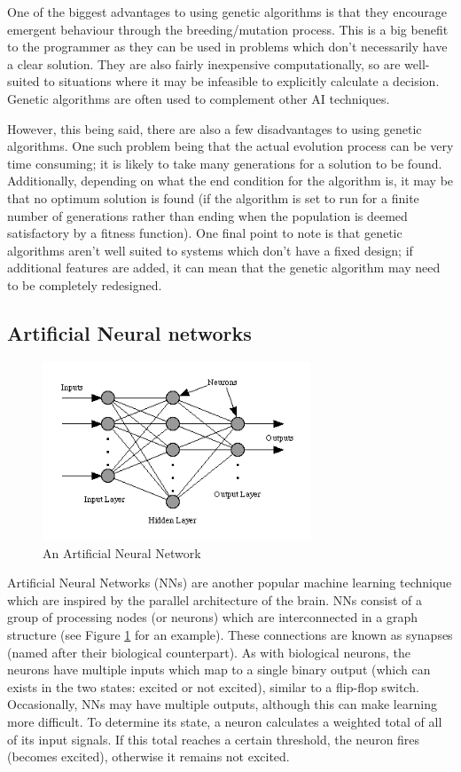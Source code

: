 \documentclass[a4paper,oneside]{report}
\begin{document}
One of the biggest advantages to using genetic algorithms is that they encourage emergent behaviour through the breeding/mutation process. This is a big benefit to the programmer as they can be used in problems which don't necessarily have a clear solution. They are also fairly inexpensive computationally, so are well-suited to situations where it may be infeasible to explicitly calculate a decision. Genetic algorithms are often used to complement other AI techniques.

However, this being said, there are also a few disadvantages to using genetic algorithms. One such problem being that the actual evolution process can be very time consuming; it is likely to take many generations for a solution to be found. Additionally, depending on what the end condition for the algorithm is, it may be that no optimum solution is found (if the algorithm is set to run for a finite number of generations rather than ending when the population is deemed satisfactory by a fitness function). One final point to note is that genetic algorithms aren't well suited to systems which don't have a fixed design; if additional features are added, it can mean that the genetic algorithm may need to be completely redesigned.

\subsection{Artificial Neural networks}

\begin{figure}
	\centering
		\includegraphics[width=80mm]{sources/images/NeuralNetwork}
    	\caption{An Artificial Neural Network \cite{Dawson:2000uq}}
    	\label{fig:NeuralNet}
\end{figure}

Artificial Neural Networks (NNs) are another popular machine learning technique which are inspired by the parallel architecture of the brain. NNs consist of a group of processing nodes (or neurons) which are interconnected in a graph structure (see Figure \ref{fig:NeuralNet} for an example). These connections are known as synapses (named after their biological counterpart). As with biological neurons, the neurons have multiple inputs which map to a single binary output (which can exists in the two states: excited or not excited), similar to a flip-flop switch. Occasionally, NNs may have multiple outputs, although this can make learning more difficult. To determine its state, a neuron calculates a weighted total of all of its input signals. If this total reaches a certain threshold, the neuron fires (becomes excited), otherwise it remains not excited. 
\end{document}
